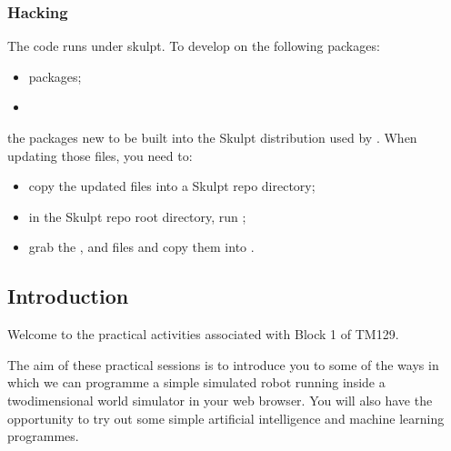 \documentclass[letterpaper,10pt,english]{sphinxmanual}
\begin{document}
\subsubsection{ Hacking}
\label{\detokenize{content/00_READ_ME_FIRST/Section:ev3devsim-Hacking}}
The  code runs under skulpt. To develop on the following packages:
\begin{itemize}
\item {} 
 packages;

\item {} 

\end{itemize}

the packages new to be built into the Skulpt distribution used by . When updating those files, you need to:
\begin{itemize}
\item {} 
copy the updated files into a Skulpt repo  directory;

\item {} 
in the Skulpt repo root directory, run ;

\item {} 
grab the ,  and  files and copy them into .

\end{itemize}


\subsection{Introduction}
\label{\detokenize{content/00_READ_ME_FIRST/Section_00_01_Introduction:Introduction}}\label{\detokenize{content/00_READ_ME_FIRST/Section_00_01_Introduction::doc}}
Welcome to the practical activities associated with Block 1 of TM129.

The aim of these practical sessions is to introduce you to some of the ways in which we can programme a simple simulated robot running inside a two\sphinxhyphen{}dimensional world simulator in your web browser. You will also have the opportunity to try out some simple artificial intelligence and machine learning programmes.
\end{document}
